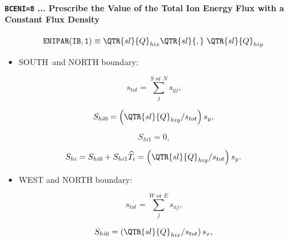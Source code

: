 \documentclass[11pt]{article}
\begin{document}
\bigskip

\bigskip

\paragraph{\texttt{BCENI=8} ... Prescribe the Value of the Total Ion Energy
Flux with a Constant Flux Density}

\bigskip

\begin{equation*}
\mathtt{ENIPAR(IB,1)}\equiv\QTR{sl}{Q}_{hix}\QTR{sl}{,}\text{ }\QTR{sl}{Q}%
_{hiy}
\end{equation*}

\bigskip

\begin{itemize}
\item  SOUTH\ and NORTH boundary:
\end{itemize}

\bigskip

\begin{equation}
s_{tot}=\sum_{j}^{S\text{ or }N}s_{yj}\text{,}   \label{c282}
\end{equation}

\begin{equation}
S_{hi0}=\left( \QTR{sl}{Q}_{hiy}/s_{tot}\right) s_{y}\text{,}   \label{c283}
\end{equation}

\begin{equation}
S_{hi1}=0\text{,}   \label{c284}
\end{equation}

\begin{equation}
S_{hi}=S_{hi0}+S_{hi1}\widehat{T}_{i}=\left( \QTR{sl}{Q}_{hiy}/s_{tot}%
\right) s_{y}\text{.}   \label{c285}
\end{equation}

\bigskip

\begin{itemize}
\item  WEST and NORTH boundary:
\end{itemize}

\bigskip

\begin{equation}
s_{tot}=\sum_{j}^{W\text{ or }E}s_{xj}\text{,}   \label{c286}
\end{equation}

\begin{equation}
S_{hi0}=\left( \QTR{sl}{Q}_{hix}/s_{tot}\right) s_{x}\text{,}   \label{c287}
\end{equation}
\end{document}
